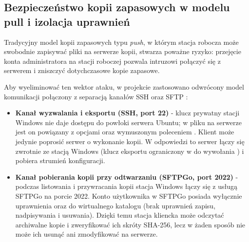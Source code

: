 \subsection{Bezpieczeństwo kopii zapasowych w modelu pull i izolacja uprawnień}\label{subsec:backup-pull-teoria}

Tradycyjny model kopii zapasowych typu \textit{push}, w którym stacja robocza może swobodnie zapisywać pliki na serwerze kopii, stwarza poważne ryzyko: przejęcie konta administratora na stacji roboczej pozwala intruzowi połączyć się z serwerem i zniszczyć dotychczasowe kopie zapasowe.

Aby wyeliminować ten wektor ataku, w projekcie zastosowano odwrócony model komunikacji połączony z separacją kanałów SSH oraz SFTP \cite{ms-openssh-windows, sftpgo-docs}:
\begin{itemize}[noitemsep, topsep=2pt]
    \item \textbf{Kanał wyzwalania i eksportu (SSH, port 22)} - klucz prywatny stacji Windows nie daje dostępu do powłoki serwera Ubuntu; w pliku  na serwerze jest on powiązany z opcjami  oraz wymuszonym poleceniem . Klient może jedynie poprosić serwer o wykonanie kopii. W odpowiedzi to serwer łączy się zwrotnie ze stacją Windows (klucz eksportu ograniczony w  do wywołania ) i pobiera strumień konfiguracji.
    \item \textbf{Kanał pobierania kopii przy odtwarzaniu (SFTPGo, port 2022)} - podczas listowania i przywracania kopii stacja Windows łączy się z usługą SFTPGo na porcie 2022. Konto użytkownika w SFTPGo posiada wyłącznie uprawnienia  oraz  do wirtualnego katalogu  (brak uprawnień zapisu, nadpisywania i usuwania). Dzięki temu stacja kliencka może odczytać archiwalne kopie i zweryfikować ich skróty SHA-256, lecz w żaden sposób nie może ich usunąć ani zmodyfikować na serwerze.
\end{itemize}
